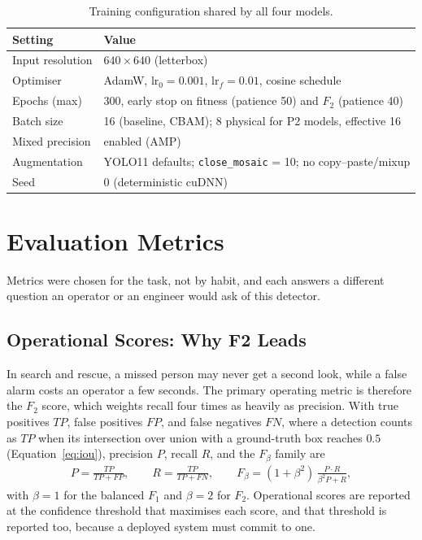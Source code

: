 \begin{table}[H]
  \centering
  \caption{Training configuration shared by all four models.}
  \label{tab:setup}
  \begin{tabular}{@{}l l@{}}
    \toprule
    \textbf{Setting} & \textbf{Value} \\
    \midrule
    Input resolution & $640 \times 640$ (letterbox) \\
    Optimiser & AdamW, $\text{lr}_0 = 0.001$, $\text{lr}_f = 0.01$, cosine schedule \\
    Epochs (max) & 300, early stop on fitness (patience 50) and $F_2$ (patience 40) \\
    Batch size & 16 (baseline, CBAM); 8 physical for P2 models, effective 16 \\
    Mixed precision & enabled (AMP) \\
    Augmentation & YOLO11 defaults; \texttt{close\_mosaic} = 10; no copy--paste/mixup \\
    Seed & 0 (deterministic cuDNN) \\
    \bottomrule
  \end{tabular}
\end{table}

\section{Evaluation Metrics}
\label{sec:metrics}
Metrics were chosen for the task, not by habit, and each answers a different
question an operator or an engineer would ask of this detector.

\subsection{Operational Scores: Why F2 Leads}
In search and rescue, a missed person may never get a second look, while a
false alarm costs an operator a few seconds. The primary operating metric is
therefore the $F_2$ score, which weights recall four times as heavily as
precision. With true positives $\mathit{TP}$, false positives $\mathit{FP}$,
and false negatives $\mathit{FN}$, where a detection counts as $\mathit{TP}$
when its intersection over union with a ground-truth box reaches $0.5$
(Equation~\ref{eq:iou}), precision $P$, recall $R$, and the $F_\beta$ family
are
\begin{align}
  P = \frac{\mathit{TP}}{\mathit{TP}+\mathit{FP}}, \qquad
  R = \frac{\mathit{TP}}{\mathit{TP}+\mathit{FN}}, \qquad
  F_\beta = (1+\beta^{2})\,\frac{P \cdot R}{\beta^{2} P + R},
\end{align}
with $\beta = 1$ for the balanced $F_1$ and $\beta = 2$ for $F_2$. Operational
scores are reported at the confidence threshold that maximises each score, and
that threshold is reported too, because a deployed system must commit to one.

